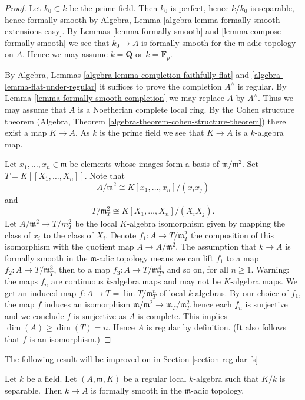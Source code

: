 \begin{proof}
Let $k_0 \subset k$ be the prime field. Then $k_0$ is perfect, hence
$k / k_0$ is separable, hence formally smooth by
Algebra, Lemma \ref{algebra-lemma-formally-smooth-extensions-easy}. By
Lemmas \ref{lemma-formally-smooth} and \ref{lemma-compose-formally-smooth}
we see that $k_0 \to A$ is formally smooth for the $\mathfrak m$-adic
topology on $A$. Hence we may assume $k = \mathbf{Q}$ or $k = \mathbf{F}_p$.

\medskip\noindent
By Algebra, Lemmas \ref{algebra-lemma-completion-faithfully-flat} and
\ref{algebra-lemma-flat-under-regular} it
suffices to prove the completion $A^\wedge$ is regular.
By Lemma \ref{lemma-formally-smooth-completion} we may replace
$A$ by $A^\wedge$. Thus we may assume that $A$ is a Noetherian
complete local ring. By the Cohen structure theorem
(Algebra, Theorem \ref{algebra-theorem-cohen-structure-theorem})
there exist a map $K \to A$. As $k$ is the prime field we see that
$K \to A$ is a $k$-algebra map.

\medskip\noindent
Let $x_1, \dots, x_n \in \mathfrak m$ be elements whose images
form a basis of $\mathfrak m/\mathfrak m^2$.
Set $T = K[[X_1, \dots, X_n]]$. Note that
$$
A/\mathfrak m^2 \cong K[x_1, \ldots, x_n]/(x_ix_j)
$$
and
$$
T/\mathfrak m_T^2 \cong K[X_1, \ldots, X_n]/(X_iX_j).
$$
Let $A/\mathfrak m^2 \to T/m_T^2$ be the local $K$-algebra isomorphism
given by mapping the class of $x_i$ to the class of $X_i$.
Denote $f_1 : A \to T/\mathfrak m_T^2$ the composition of this
isomorphism with the quotient map $A \to A/\mathfrak m^2$.
The assumption that $k \to A$ is formally smooth in the $\mathfrak m$-adic
topology means we can lift $f_1$ to a map
$f_2 : A \to T/\mathfrak{m}_T^3$, then to a map
$f_3 : A \to T/\mathfrak{m}_T^4$, and so on, for all $n \geq 1$.
Warning: the maps $f_n$ are continuous $k$-algebra maps and may not
be $K$-algebra maps. We get an induced map
$f : A \to T = \lim T/\mathfrak m_T^n$ of local $k$-algebras.
By our choice of $f_1$, the map $f$ induces an
isomorphism $\mathfrak m/\mathfrak m^2 \to \mathfrak m_T/\mathfrak m_T^2$
hence each $f_n$ is surjective and we conclude $f$ is surjective as $A$ is
complete. This implies $\dim(A) \geq \dim(T) = n$. Hence $A$ is regular
by definition. (It also follows that $f$ is an isomorphism.)
\end{proof}

\noindent
The following result will be improved on in
Section \ref{section-regular-fs}

\begin{lemma}
\label{lemma-regular-implies-fs}
Let $k$ be a field. Let $(A, \mathfrak m, K)$ be a regular local
$k$-algebra such that $K/k$ is separable. Then $k \to A$
is formally smooth in the $\mathfrak m$-adic topology.
\end{lemma}

